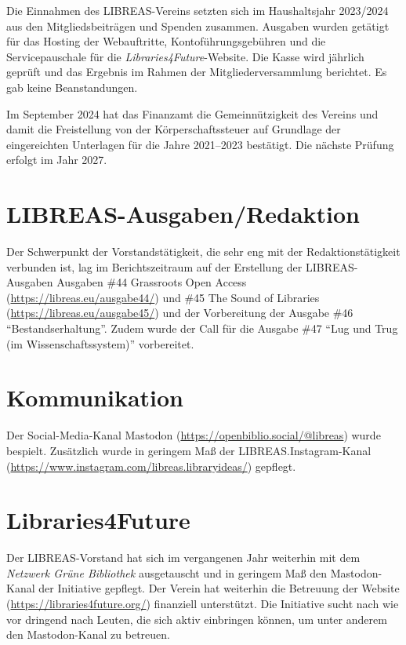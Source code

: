 \documentclass[a4paper,
fontsize=11pt,
oneside,
numbers=noperiodatend,
parskip=half-,
bibliography=totoc,
final
]{scrartcl}
\begin{document}
Die Einnahmen des LIBREAS-Vereins setzten sich im Haushaltsjahr
2023/2024 aus den Mitgliedsbeiträgen und Spenden zusammen. Ausgaben
wurden getätigt für das Hosting der Webauftritte, Kontoführungsgebühren
und die Servicepauschale für die \emph{Libraries4Future}-Website. Die
Kasse wird jährlich geprüft und das Ergebnis im Rahmen der
Mitgliederversammlung berichtet. Es gab keine Beanstandungen.

Im September 2024 hat das Finanzamt die Gemeinnützigkeit des Vereins und
damit die Freistellung von der Körperschaftssteuer auf Grundlage der
eingereichten Unterlagen für die Jahre 2021--2023 bestätigt. Die nächste
Prüfung erfolgt im Jahr 2027.

\section{LIBREAS-Ausgaben/Redaktion}\label{libreas-ausgabenredaktion}

Der Schwerpunkt der Vorstandstätigkeit, die sehr eng mit der
Redaktionstätigkeit verbunden ist, lag im Berichtszeitraum auf der
Erstellung der LIBREAS-Ausgaben Ausgaben \#44 Grassroots Open Access
(\url{https://libreas.eu/ausgabe44/}) und \#45 The Sound of Libraries
(\url{https://libreas.eu/ausgabe45/}) und der Vorbereitung der Ausgabe
\#46 \enquote{Bestandserhaltung}. Zudem wurde der Call für die Ausgabe
\#47 \enquote{Lug und Trug (im Wissenschaftssystem)} vorbereitet.\\

\section{Kommunikation}\label{kommunikation}

Der Social-Media-Kanal Mastodon
(\url{https://openbiblio.social/@libreas}) wurde bespielt. Zusätzlich
wurde in geringem Maß der LIBREAS.Instagram-Kanal
(\url{https://www.instagram.com/libreas.libraryideas/}) gepflegt.

\section{Libraries4Future}\label{libraries4future}

Der LIBREAS-Vorstand hat sich im vergangenen Jahr weiterhin mit dem
\emph{Netzwerk Grüne Bibliothek} ausgetauscht und in geringem Maß den
Mastodon-Kanal der Initiative gepflegt. Der Verein hat weiterhin die
Betreuung der Website (\url{https://libraries4future.org/}) finanziell
unterstützt. Die Initiative sucht nach wie vor dringend nach Leuten, die
sich aktiv einbringen können, um unter anderem den Mastodon-Kanal zu
betreuen.

\end{document}
